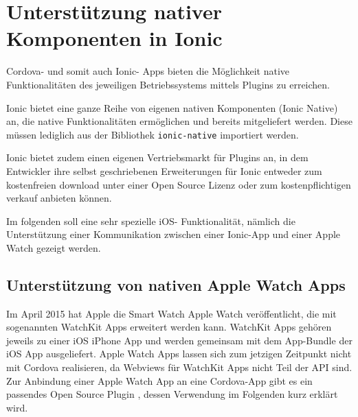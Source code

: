 \chapter{Unterstützung nativer Komponenten in Ionic}
%
Cordova- und somit auch Ionic- Apps bieten die Möglichkeit native Funktionalitäten des jeweiligen Betriebssystems mittels Plugins zu erreichen. 

Ionic bietet eine ganze Reihe von eigenen nativen Komponenten (Ionic Native) an, die native Funktionalitäten ermöglichen und bereits mitgeliefert werden. Diese müssen lediglich aus der Bibliothek \texttt{ionic-native} importiert werden.

Ionic bietet zudem einen eigenen Vertriebsmarkt für Plugins an, in dem Entwickler ihre selbst geschriebenen Erweiterungen für Ionic entweder zum kostenfreien download unter einer Open Source Lizenz oder zum kostenpflichtigen verkauf anbieten können. 

Im folgenden soll eine sehr spezielle iOS- Funktionalität, nämlich die Unterstützung einer Kommunikation zwischen einer Ionic-App und einer Apple Watch gezeigt werden.
%
\section{Unterstützung von nativen Apple Watch Apps}
%
Im April 2015 hat Apple die Smart Watch Apple Watch veröffentlicht, die mit sogenannten WatchKit Apps erweitert werden kann. WatchKit Apps gehören jeweils zu einer iOS iPhone App und werden gemeinsam mit dem App-Bundle der iOS App ausgeliefert. Apple Watch Apps lassen sich zum jetzigen Zeitpunkt nicht mit Cordova realisieren, da Webviews für WatchKit Apps nicht Teil der API sind.
Zur Anbindung einer Apple Watch App an eine Cordova-App gibt es ein passendes Open Source Plugin \cite{CrossleyCordovaAppleWatchPlugin}, dessen Verwendung im Folgenden kurz erklärt wird.


